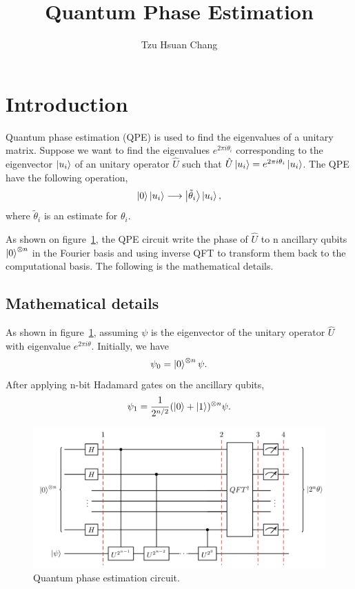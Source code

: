 \documentclass[a4paper]{article}
\title{Quantum Phase Estimation}
\author{Tzu Hsuan Chang}
\begin{document}
\maketitle

\section{Introduction}
\label{sec:Intro}
Quantum phase estimation (QPE) is used to find the eigenvalues of a unitary matrix. Suppose we want to find the eigenvalues $e^{2 \pi i \theta_i}$ corresponding to the eigenvector $\ket {u_i}$ of an unitary operator $\hat{U}$ such that
$\hat{U} \ket{u_i}  = e^{2 \pi i \theta_i} \ket{u_i}$. The QPE have the following operation,
    \begin{equation} \label{eq:eq1}
    \setlength{\jot}{10pt}
        \ket{0} \ket{u_i}   \longrightarrow   \ket{\tilde \theta_i} \ket{u_i},
    \end{equation}
where $\tilde \theta_i$ is an estimate for $\theta_i$.

As shown on figure~\ref{fig:qpe}, the QPE circuit write the phase of $\hat U$ to n ancillary qubits $\ket{0}^{\otimes n}$ in the Fourier basis and using inverse QFT to transform them back to the computational basis. The following is the mathematical details.

\subsection*{Mathematical details}
\label {subsec:qpe}

As shown in figure~\ref{fig:qpe}, assuming $\psi$ is the eigenvector of the unitary operator $\hat U$ with eigenvalue $e^{2 \pi i \theta}$. Initially, we have
    \begin{equation} \label{eq:eq2}
    \setlength{\jot}{10pt}
        \psi_0 = \ket{0}^{\otimes n} \psi.
    \end{equation}
After applying n-bit Hadamard gates on the ancillary qubits,
    \begin{equation} \label{eq:eq2}
    \setlength{\jot}{10pt}
        \psi_1 = \frac{1}{2^{n/2}} (\ket{0} + \ket{1})^{\otimes n} \psi.
    \end{equation}

    \begin{figure}
        \centering
            \includegraphics [width=\textwidth, height=\textheight, keepaspectratio] {qpe_tex_qz.png}
        \caption{Quantum phase estimation circuit.\cite{Qiskit-Textbook}}
        \label{fig:qpe}
    \end{figure}




\end{document}
